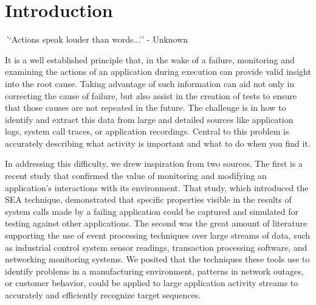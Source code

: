 \section{Introduction}
\label{SEC:introduction}


{\textit ``Actions speak louder than words...'' - Unknown}


It is a well established principle
that, in the wake of a failure,
monitoring and examining the actions
of an application
during execution can provide valid insight
into the root cause.
Taking advantage of such information
can aid not only in correcting
the cause of failure,
but also assist in the creation
of tests to ensure
that those causes
are not repeated in the future.
The challenge is in
how to identify and extract this data
from large and detailed sources like application logs,
system call traces,
or application recordings.
Central to this problem
is accurately describing what activity is important
and what to do when you find it.

In addressing this difficulty, we drew inspiration from two sources. The
first is a recent study that confirmed the value of monitoring and
modifying an application’s interactions with its environment. That study,
which introduced the SEA technique, demonstrated that specific properties
visible in the results of system calls made by a failing application could
be captured and simulated for testing against other applications.  The
second was the great amount of literature supporting the use of event
processing techniques over large streams of data, such as industrial
control system sensor readings, transaction processing software, and
networking monitoring systems. We posited that the techniques these tools
use to identify problems in a manufacturing environment, patterns in
network outages, or customer behavior, could be applied to large
application activity streams to accurately and efficiently recognize target
sequences.


